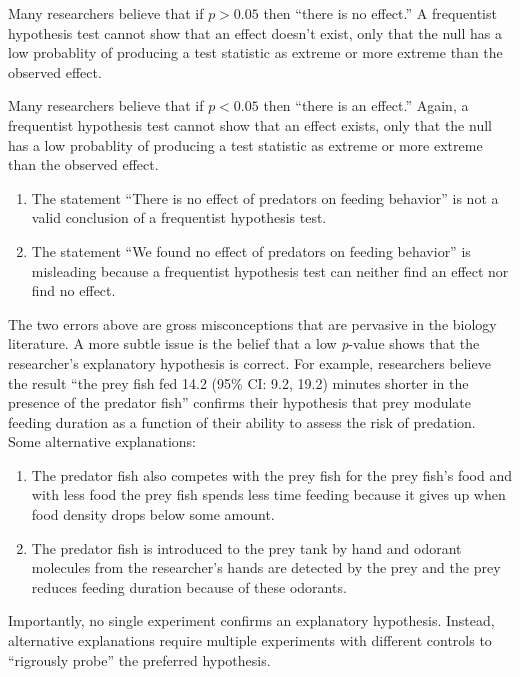 \documentclass[]{book}
\providecommand{\tightlist}{%
  \setlength{\itemsep}{0pt}\setlength{\parskip}{0pt}}
\begin{document}
Many researchers believe that if \(p > 0.05\) then ``there is no effect.'' A frequentist hypothesis test cannot show that an effect doesn't exist, only that the null has a low probablity of producing a test statistic as extreme or more extreme than the observed effect.

Many researchers believe that if \(p < 0.05\) then ``there is an effect.'' Again, a frequentist hypothesis test cannot show that an effect exists, only that the null has a low probablity of producing a test statistic as extreme or more extreme than the observed effect.

\begin{enumerate}
\def\labelenumi{\arabic{enumi}.}
\tightlist
\item
  The statement ``There is no effect of predators on feeding behavior'' is not a valid conclusion of a frequentist hypothesis test.
\item
  The statement ``We found no effect of predators on feeding behavior'' is misleading because a frequentist hypothesis test can neither find an effect nor find no effect.
\end{enumerate}

The two errors above are gross misconceptions that are pervasive in the biology literature. A more subtle issue is the belief that a low \emph{p}-value shows that the researcher's explanatory hypothesis is correct. For example, researchers believe the result ``the prey fish fed 14.2 (95\% CI: 9.2, 19.2) minutes shorter in the presence of the predator fish'' confirms their hypothesis that prey modulate feeding duration as a function of their ability to assess the risk of predation. Some alternative explanations:

\begin{enumerate}
\def\labelenumi{\arabic{enumi}.}
\tightlist
\item
  The predator fish also competes with the prey fish for the prey fish's food and with less food the prey fish spends less time feeding because it gives up when food density drops below some amount.
\item
  The predator fish is introduced to the prey tank by hand and odorant molecules from the researcher's hands are detected by the prey and the prey reduces feeding duration because of these odorants.
\end{enumerate}

Importantly, no single experiment confirms an explanatory hypothesis. Instead, alternative explanations require multiple experiments with different controls to ``rigrously probe'' the preferred hypothesis.
\end{document}
